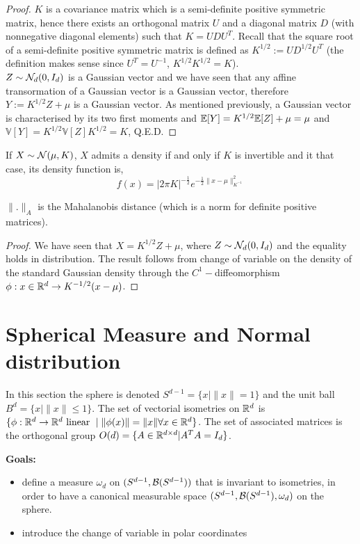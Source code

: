 \documentclass{article}
\begin{document}
\begin{proof}
  $K$ is a covariance matrix which is a semi-definite positive symmetric matrix,
  hence there exists an orthogonal matrix $U$ and a diagonal matrix $D$ (with nonnegative diagonal
  elements) such that $K = UDU^T$. Recall that the square root of a
  semi-definite positive symmetric matrix is defined as $K^{1/2}:= UD^{1/2}U^T$ (the
  definition makes sense since $U^T = U^{-1}$, $K^{1/2}K^{1/2} = K$).\\
  $Z \sim \mathcal{N}_d(0,I_d)$ is a Gaussian vector and we have seen that any affine transormation of a
  Gaussian vector is a Gaussian vector, therefore $Y:= K^{1/2}Z + \mu$ is a
  Gaussian vector. As mentioned previously, a Gaussian vector is characterised
  by its two first moments and $\mathbb{E}[Y] =K^{1/2}\mathbb{E}[Z]+\mu = \mu$ and $\mathbb{V}[Y] =
  K^{1/2}\mathbb{V}[Z]K^{1/2} = K$, Q.E.D.
\end{proof}

\begin{prop}
  If $X \sim \mathcal{N}(\mu,K)$, $X$ admits a density if and only if $K$ is
  invertible and it that case, its density function is,
  $$f(x)=|2 \pi K|^{-\frac{1}{2}} e^{-\frac{1}{2}\|x - \mu\|_{K^{-1}}^{2}}$$
\end{prop}

$\|.\|_A$ is the Mahalanobis distance (which is a norm for  definite positive matrices).

\begin{proof}
  We have seen that $X = K^{1/2}Z + \mu$, where $Z \sim \mathcal{N}_d(0,I_d)$ and the equality holds in
  distribution. The result follows from change of variable on the density of the
  standard Gaussian density through the $C^1-$diffeomorphism $\phi:
  x \in \mathbb{R}^{d} \to K^{-1/2}(x - \mu)$.
\end{proof}

\section{Spherical Measure and Normal distribution}

In this section the sphere is denoted $S^{d-1} = \{x \mid \|x\|=1\}$ and the
unit ball $B^d = \{x \mid \|x\| \leq 1\}$. The set of vectorial isometries on
$\mathbb{R}^{d}$ is $\{\phi:\mathbb{R}^{d} \to \mathbb{R}^{d} \text{ linear } \mid \|\phi(x)\|=\|x\| \forall x
\in \mathbb{R}^{d} \}$. The set of associated matrices is the orthogonal group $O(d) = \{A
\in \mathbb{R}^{d \times d} | A^TA = I_d\}$. 

\textbf{Goals:}
\begin{itemize}
\item define a measure $\omega_d$ on
  $(S^{d-1},\mathcal{B}(S^{d-1}))$ that is invariant to isometries, in order to have a
  canonical measurable space $(S^{d-1},\mathcal{B}(S^{d-1}), \omega_d)$ on the sphere.
\item introduce the change of variable in polar coordinates
\end{itemize}
\end{document}

